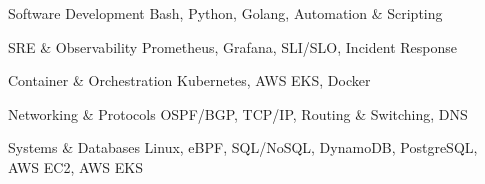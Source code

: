 

\begin{cvskills}

  \cvskill
    {Software Development} %
    {Bash, Python, Golang, Automation \& Scripting} %

  \cvskill
    {SRE \& Observability} %
    {Prometheus, Grafana, SLI/SLO, Incident Response} %

 \cvskill
    {Container \& Orchestration} %
    {Kubernetes, AWS EKS, Docker} %

  \cvskill
    {Networking \& Protocols} %
    {OSPF/BGP, TCP/IP, Routing \& Switching, DNS} %


  \cvskill
    {Systems \& Databases} %
    {Linux, eBPF, SQL/NoSQL, DynamoDB, PostgreSQL, AWS EC2, AWS EKS} %

\end{cvskills}
